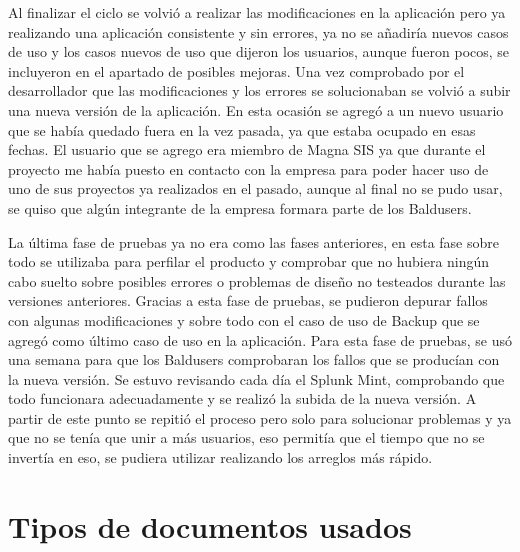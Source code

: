 Al finalizar el ciclo se volvió a realizar las modificaciones en la aplicación pero ya realizando una aplicación consistente y sin errores, ya no se añadiría nuevos casos de uso y los casos nuevos de uso que dijeron los usuarios, aunque fueron pocos, se incluyeron en el apartado de posibles mejoras.
Una vez comprobado por el desarrollador que las modificaciones y los errores se solucionaban se volvió a subir una nueva versión de la aplicación. En esta ocasión se agregó a un nuevo usuario que se había quedado fuera en la vez pasada, ya que estaba ocupado en esas fechas.
El usuario que se agrego era miembro de Magna SIS ya que durante el proyecto me había puesto en contacto con la empresa para poder hacer uso de uno de sus proyectos ya realizados en el pasado, aunque al final no se pudo usar, se quiso que algún integrante de la empresa formara parte de los Baldusers.

La última fase de pruebas ya no era como las fases anteriores, en esta fase sobre todo se utilizaba para perfilar el producto y comprobar que no hubiera ningún cabo suelto sobre posibles errores o problemas de diseño no testeados durante las versiones anteriores.
Gracias a esta fase de pruebas, se pudieron depurar fallos con algunas modificaciones y sobre todo con el caso de uso de Backup que se agregó como último caso de uso en la aplicación.
Para esta fase de pruebas, se usó una semana para que los Baldusers comprobaran los fallos que se producían con la nueva versión.
Se estuvo revisando cada día el Splunk Mint, comprobando que todo funcionara adecuadamente y se realizó la subida de la nueva versión.
A partir de este punto se repitió el proceso pero solo para solucionar problemas y ya que no se tenía que unir a más usuarios, eso permitía que el tiempo que no se invertía en eso, se pudiera utilizar realizando los arreglos más rápido.



\section{Tipos de documentos usados}
\label{secc:tipos de documentos usados}

